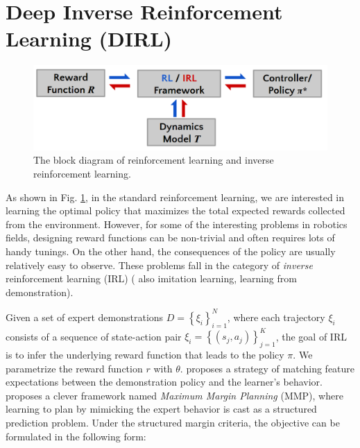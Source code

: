 \documentclass[../thesis.tex]{subfiles}
\begin{document}
 
 
\section{Deep Inverse Reinforcement Learning (DIRL)}
\label{sec:dirl_intro}
 
 
\begin{figure}[b]
      \begin{center}
       \centerline{\includegraphics[width=0.5\columnwidth]{./DIRL/fig/irl_rl_pipeline.png}}
            \caption{The block diagram of reinforcement learning and inverse reinforcement learning.}
            \label{fig:irl_rl}
      \end{center}
\end{figure}
 
As shown in Fig. \ref{fig:irl_rl}, in the standard reinforcement learning, we are interested in learning the optimal policy that maximizes the total expected rewards collected from the environment.
However, for some of the interesting problems in robotics fields, designing reward functions can be non-trivial and often requires lots of handy tunings.
On the other hand, the consequences of the policy are usually relatively easy to observe.
These problems fall in the category of \textit{inverse} reinforcement learning (IRL) \cite{ng2000algorithms} ( also imitation learning, learning from demonstration).
 
 
 
Given a set of expert demonstrations $D=\left\{ \xi_i \right\}_{i=1}^{N}$, where each trajectory $\xi_i$ consists of a sequence of state-action pair $\xi_i = \left\{ (s_j, a_j) \right\}_{j=1}^{K}$, the goal of IRL is to infer the underlying reward function that leads to the policy $\pi$.
We parametrize the reward function $r$ with $\theta$. \citet{abbeel2004apprenticeship} proposes a strategy of matching feature expectations between the demonstration policy and the learner's behavior. 
\citet{ratliff2006maximum} proposes a clever framework named \textit{Maximum Margin Planning} (MMP), where learning to plan by mimicking the expert behavior is cast as a structured prediction problem. Under the structured margin criteria, the objective can be formulated in the following form:
 
\end{document}
